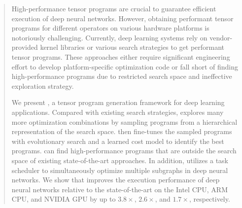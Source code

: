 \begin{abstract}

High-performance tensor programs are crucial to guarantee efficient execution of deep neural networks. However, obtaining performant tensor programs for different operators on various hardware platforms is notoriously challenging. Currently, deep learning systems rely on vendor-provided kernel libraries or various search strategies to get performant tensor programs.
These approaches either require significant engineering effort to develop platform-specific optimization code or fall short of finding high-performance programs due to restricted search space and ineffective exploration strategy.

We present \Ansor, a tensor program generation framework for deep learning applications. 
Compared with existing search strategies, \Ansor explores many more optimization combinations by sampling programs from a hierarchical representation of the search space. 
\Ansor then fine-tunes the sampled programs with evolutionary search and a learned cost model to identify the best programs.
\Ansor can find high-performance programs that are outside the search space of existing state-of-the-art approaches.
In addition, \Ansor utilizes a task scheduler to simultaneously optimize multiple subgraphs in deep neural networks.
We show that \Ansor improves the execution performance of deep neural networks relative to the state-of-the-art on the Intel CPU, ARM CPU, and NVIDIA GPU by up to  $3.8\times$, $2.6\times$, and $1.7\times$, respectively.

\end{abstract}